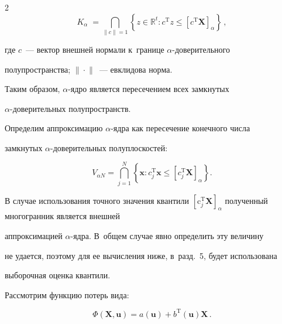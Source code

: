 \begin{multicols}{2}
\begin{equation*}
K_\alpha \; = \bigcap\limits_{\| c\|=1}

\left \{z\in \mathbb R^t:c^\mathrm{T} z\leqslant 

\left[c^\mathrm{T} \mathbf X\right]_\alpha\right\}\,,


\end{equation*}

 где $c$~--- вектор внешней нормали к~границе $\alpha$-до\-ве\-ри\-тель\-но\-го 

 полупространства; $\parallel \!\!\cdot\!\! \parallel$~--- евклидова норма.

Таким образом, $\alpha$-яд\-ро является пересечением всех замк\-ну\-тых 

$\alpha$-до\-ве\-ри\-тель\-ных полупространств.



Определим аппроксимацию $\alpha$-яд\-ра как пересечение конечного числа 

замкнутых $\alpha$-до\-ве\-ри\-тель\-ных полуплоскостей:

\begin{equation}

V_{\alpha N}=\bigcap\limits_{j=1}^{N} \left\{ 

\mathbf x: c_j^\mathrm{T} \mathbf  x \leqslant  

\left [ c_j^\mathrm{T} \mathbf X \right ]_\alpha\right \}.

\label{e6-vas}

\end{equation}



В случае использования точ\-но\-го значения квантили $\left [ \mathrm c_j^\mathrm{T} 

\mathbf X \right ]_\alpha$ полученный многогранник является внеш\-ней 

аппроксимацией $\alpha$-яд\-ра. В~общем случае явно определить эту величину 

не удается, поэтому для ее вы\-чис\-ле\-ния ниже, в~разд.~5, будет использована 

выборочная оценка квантили.



Рассмотрим функцию потерь вида:

\begin{equation}

\Phi(\mathbf X, \mathbf u)=a(\mathbf u)+b^{\mathrm{T}}(\mathbf u) \mathbf X\,.

\label{e7-vas}


\end{equation}
\end{multicols}
